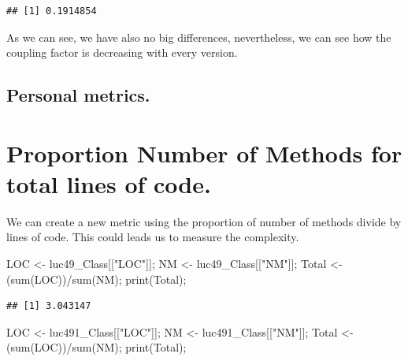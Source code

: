 \documentclass[
]{article}
\newenvironment{Shaded}{\begin{snugshade}}{\end{snugshade}}
\newcommand{\FunctionTok}[1]{\textcolor[rgb]{0.00,0.00,0.00}{#1}}
\newcommand{\NormalTok}[1]{#1}
\newcommand{\OtherTok}[1]{\textcolor[rgb]{0.56,0.35,0.01}{#1}}
\newcommand{\SpecialCharTok}[1]{\textcolor[rgb]{0.00,0.00,0.00}{#1}}
\newcommand{\StringTok}[1]{\textcolor[rgb]{0.31,0.60,0.02}{#1}}
\begin{document}
\begin{verbatim}
## [1] 0.1914854
\end{verbatim}

As we can see, we have also no big differences, nevertheless, we can see
how the coupling factor is decreasing with every version.

\hypertarget{personal-metrics.}{%
\subsection{Personal metrics.}\label{personal-metrics.}}

\hypertarget{proportion-number-of-methods-for-total-lines-of-code.}{%
\section{Proportion Number of Methods for total lines of
code.}\label{proportion-number-of-methods-for-total-lines-of-code.}}

We can create a new metric using the proportion of number of methods
divide by lines of code. This could leads us to measure the complexity.

\begin{Shaded}
\begin{Highlighting}[]
\NormalTok{LOC }\OtherTok{\textless{}{-}}\NormalTok{ luc49\_Class[[}\StringTok{"LOC"}\NormalTok{]];}
\NormalTok{NM }\OtherTok{\textless{}{-}}\NormalTok{ luc49\_Class[[}\StringTok{"NM"}\NormalTok{]];}
\NormalTok{Total }\OtherTok{\textless{}{-}}\NormalTok{ (}\FunctionTok{sum}\NormalTok{(LOC))}\SpecialCharTok{/}\FunctionTok{sum}\NormalTok{(NM);}
\FunctionTok{print}\NormalTok{(Total);}
\end{Highlighting}
\end{Shaded}

\begin{verbatim}
## [1] 3.043147
\end{verbatim}

\begin{Shaded}
\begin{Highlighting}[]
\NormalTok{LOC }\OtherTok{\textless{}{-}}\NormalTok{ luc491\_Class[[}\StringTok{"LOC"}\NormalTok{]];}
\NormalTok{NM }\OtherTok{\textless{}{-}}\NormalTok{ luc491\_Class[[}\StringTok{"NM"}\NormalTok{]];}
\NormalTok{Total }\OtherTok{\textless{}{-}}\NormalTok{ (}\FunctionTok{sum}\NormalTok{(LOC))}\SpecialCharTok{/}\FunctionTok{sum}\NormalTok{(NM);}
\FunctionTok{print}\NormalTok{(Total);}
\end{Highlighting}
\end{Shaded}
\end{document}
